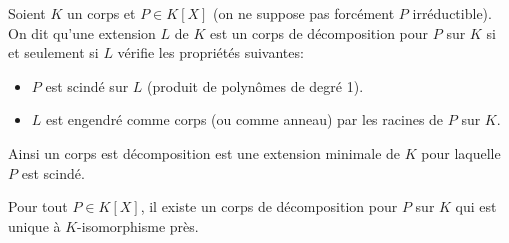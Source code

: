 \begin{definition}
	Soient $K$ un corps et $P\in K[X]$ (on ne suppose pas forcément $P$ irréductible).\\
	On dit qu'une extension $L$ de $K$ est un corps de décomposition pour $P$ sur $K$ si et seulement si $L$ vérifie les propriétés suivantes:
	\begin{itemize}
		\item $P$ est scindé sur $L$ (produit de polynômes de degré 1).
		\item $L$ est engendré comme corps (ou comme anneau) par les racines de $P$ sur $K$.
	\end{itemize}

	Ainsi un corps est décomposition est une extension minimale de $K$ pour laquelle $P$ est scindé.
\end{definition}

\begin{theorem}
	Pour tout $P\in K[X]$, il existe un corps de décomposition pour $P$ sur $K$ qui est unique à $K$-isomorphisme près.
\end{theorem}

